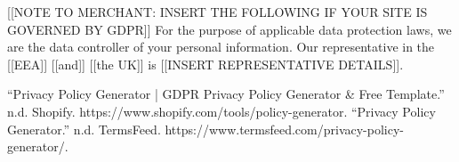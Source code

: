 \documentclass[conference]{IEEEtran}
\begin{document}
[[NOTE TO MERCHANT: INSERT THE FOLLOWING IF YOUR SITE IS GOVERNED BY GDPR]] For the purpose of applicable data protection laws, we are the data controller of your personal information. Our representative in the [[EEA]] [[and]] [[the UK]] is [[INSERT REPRESENTATIVE DETAILS]].


\begin{thebibliography}{00}
     “Privacy Policy Generator | GDPR Privacy Policy Generator \& Free Template.” n.d. Shopify. 
    \newline https://www.shopify.com/tools/policy-generator.
    “Privacy Policy Generator.” n.d. TermsFeed. 
    \newline https://www.termsfeed.com/privacy-policy-generator/.
\end{thebibliography}
    
\end{document}
